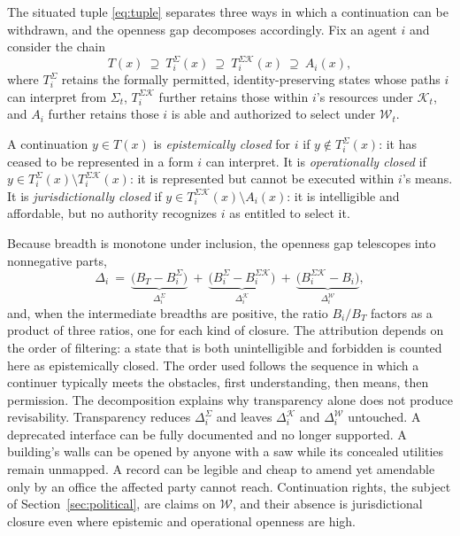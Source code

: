 The situated tuple \eqref{eq:tuple} separates three ways in which a continuation can be withdrawn, and the openness gap decomposes accordingly. Fix an agent $i$ and consider the chain
\[
T(x)\ \supseteq\ T^{\Sigma}_i(x)\ \supseteq\ T^{\Sigma\mathcal{K}}_i(x)\ \supseteq\ A_i(x),
\]
where $T^{\Sigma}_i$ retains the formally permitted, identity-preserving states whose paths $i$ can interpret from $\Sigma_t$, $T^{\Sigma\mathcal{K}}_i$ further retains those within $i$'s resources under $\mathcal{K}_t$, and $A_i$ further retains those $i$ is able and authorized to select under $\mathcal{W}_t$.

\begin{definition}\label{def:three-closures}
A continuation $y\in T(x)$ is \emph{epistemically closed} for $i$ if $y\notin T^{\Sigma}_i(x)$: it has ceased to be represented in a form $i$ can interpret. It is \emph{operationally closed} if $y\in T^{\Sigma}_i(x)\setminus T^{\Sigma\mathcal{K}}_i(x)$: it is represented but cannot be executed within $i$'s means. It is \emph{jurisdictionally closed} if $y\in T^{\Sigma\mathcal{K}}_i(x)\setminus A_i(x)$: it is intelligible and affordable, but no authority recognizes $i$ as entitled to select it.
\end{definition}

Because breadth is monotone under inclusion, the openness gap telescopes into nonnegative parts,
\begin{equation}\label{eq:gap-decomp}
\Delta_i\ =\ \underbrace{\big(B_T-B^{\Sigma}_i\big)}_{\Delta_i^{\Sigma}}\ +\ \underbrace{\big(B^{\Sigma}_i-B^{\Sigma\mathcal{K}}_i\big)}_{\Delta_i^{\mathcal{K}}}\ +\ \underbrace{\big(B^{\Sigma\mathcal{K}}_i-B_i\big)}_{\Delta_i^{\mathcal{W}}},
\end{equation}
and, when the intermediate breadths are positive, the ratio $B_i/B_T$ factors as a product of three ratios, one for each kind of closure. The attribution depends on the order of filtering: a state that is both unintelligible and forbidden is counted here as epistemically closed. The order used follows the sequence in which a continuer typically meets the obstacles, first understanding, then means, then permission. The decomposition explains why transparency alone does not produce revisability. Transparency reduces $\Delta_i^{\Sigma}$ and leaves $\Delta_i^{\mathcal{K}}$ and $\Delta_i^{\mathcal{W}}$ untouched. A deprecated interface can be fully documented and no longer supported. A building's walls can be opened by anyone with a saw while its concealed utilities remain unmapped. A record can be legible and cheap to amend yet amendable only by an office the affected party cannot reach. Continuation rights, the subject of Section~\ref{sec:political}, are claims on $\mathcal{W}$, and their absence is jurisdictional closure even where epistemic and operational openness are high.

